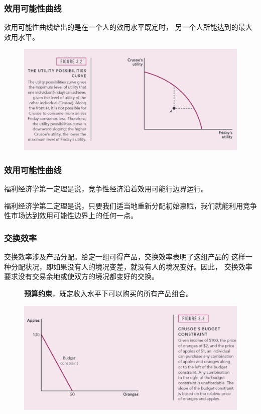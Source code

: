 \documentclass[aspectratio=169, 12pt]{beamer}
\begin{document}
\begin{frame}[plain]
    \frametitle{效用可能性曲线}
    效用可能性曲线给出的是在一个人的效用水平既定时，
    另一个人所能达到的最大效用水平。
    \begin{figure}
        \centering
        \includegraphics[width=1.0\textwidth]{./resources/figure/utilityc.png}
    \end{figure}
\end{frame}

\begin{frame}[plain]
    \frametitle{效用可能性曲线}
    福利经济学第一定理是说，竞争性经济沿着效用可能行边界运行。
    \par
    福利经济学第二定理是说，只要我们适当地重新分配初始禀赋，我们就能利用竞争性市场达到效用可能性边界上的任何一点。
\end{frame}

\begin{frame}[plain]
    \frametitle{交换效率}
    交换效率涉及产品分配。给定一组可得产品，交换效率表明了这组产品的
    这样一种分配状况，即如果没有人的境况变差，就没有人的境况变好。因此，
    交换效率要求没有交易余地或使双方的境况都变好的交换。
    \begin{figure}
        \centering
        \begin{minipage}{0.2\linewidth}
           \textbf{预算约束}，既定收入水平下可以购买的所有产品组合。
        \end{minipage}%
        \begin{minipage}{0.1\linewidth}
        { }
        \end{minipage}
        \begin{minipage}{0.7\linewidth}
            \centering
            \includegraphics[width=1.0\textwidth]{./resources/figure/budget.png}
        \end{minipage}
    \end{figure}
\end{frame}
\end{document}
